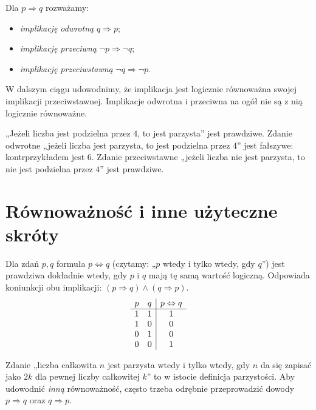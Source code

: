 \begin{definicja}
Dla $p\Rightarrow q$ rozważamy:
\begin{itemize}
\item \emph{implikację odwrotną} $q\Rightarrow p$;
\item \emph{implikację przeciwną} $\neg p\Rightarrow\neg q$;
\item \emph{implikację przeciwstawną} $\neg q\Rightarrow\neg p$.
\end{itemize}
W dalszym ciągu udowodnimy, że implikacja jest logicznie
równoważna swojej implikacji przeciwstawnej. Implikacje odwrotna
i przeciwna na ogół nie są z nią logicznie równoważne.
\end{definicja}

\begin{przyklad}
„Jeżeli liczba jest podzielna przez $4$, to jest parzysta”
jest prawdziwe. Zdanie odwrotne „jeżeli liczba jest parzysta,
to jest podzielna przez $4$” jest fałszywe: kontrprzykładem
jest $6$. Zdanie przeciwstawne „jeżeli liczba nie jest
parzysta, to nie jest podzielna przez $4$” jest prawdziwe.
\end{przyklad}

\section{Równoważność i inne użyteczne skróty}\label{sec:biconditional}
\begin{definicja}[Równoważność]\label{def:biconditional}
Dla zdań $p,q$ formuła $p\Leftrightarrow q$
(czytamy: „$p$ wtedy i tylko wtedy, gdy $q$”)
jest prawdziwa dokładnie wtedy, gdy $p$ i $q$ mają tę samą
wartość logiczną. Odpowiada koniunkcji obu implikacji:
$(p\Rightarrow q)\land(q\Rightarrow p)$.
\[
\begin{array}{c c|c}
p&q&p\Leftrightarrow q\\\hline
1&1&1\\
1&0&0\\
0&1&0\\
0&0&1
\end{array}
\]
\end{definicja}

\begin{przyklad}
Zdanie „liczba całkowita $n$ jest parzysta wtedy i tylko wtedy,
gdy $n$ da się zapisać jako $2k$ dla pewnej liczby całkowitej $k$”
to w istocie definicja parzystości. Aby udowodnić \emph{inną}
równoważność, często trzeba odrębnie przeprowadzić dowody
$p\Rightarrow q$ oraz $q\Rightarrow p$.
\end{przyklad}

